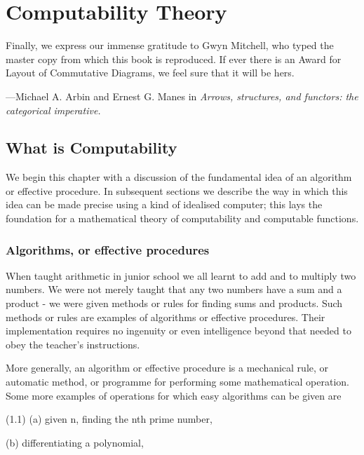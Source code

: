 \def\mterm#1{{\upshape \bfseries #1}}
\def\mra{x_1,\dots,x_k}
\def\prim{\textsc{prim}\xspace}
\def\URM{\textsc{urm}\xspace}
\def\renderURM#1{$$\directlua{
   urm=require("urm.lua")
   urm.RenderFromTable({#1})}$$
}

\chapter{Computability Theory}

\epigraph{Finally, we express our immense gratitude to Gwyn Mitchell, who typed 
the master copy from which this book is reproduced. If ever there is an Award 
for Layout of Commutative Diagrams, we feel sure that it will be hers. 
}{---Michael A. Arbin and Ernest G. Manes in \textit{Arrows, structures, and functors: the categorical imperative.}}

\section{What is Computability}

We begin this chapter with a discussion of the fundamental idea of an 
algorithm or effective procedure. In subsequent sections we describe the 
way in which this idea can be made precise using a kind of idealised 
computer; this lays the foundation for a mathematical theory of computability and computable functions.
 
\subsection*{Algorithms, or effective procedures}
 
When taught arithmetic in junior school we all learnt to add and 
to multiply two numbers. We were not merely taught that any two 
numbers have a sum and a product - we were given methods or rules for 
finding sums and products. Such methods or rules are examples of 
algorithms or effective procedures. Their implementation requires no 
ingenuity or even intelligence beyond that needed to obey the teacher's 
instructions. 

More generally, an algorithm or effective procedure is a mechanical 
rule, or automatic method, or programme for performing some  
mathematical operation. Some more examples of operations for which easy 
algorithms can be given are 

(1.1) (a) given n, finding the nth prime number, 

(b) differentiating a polynomial, 

